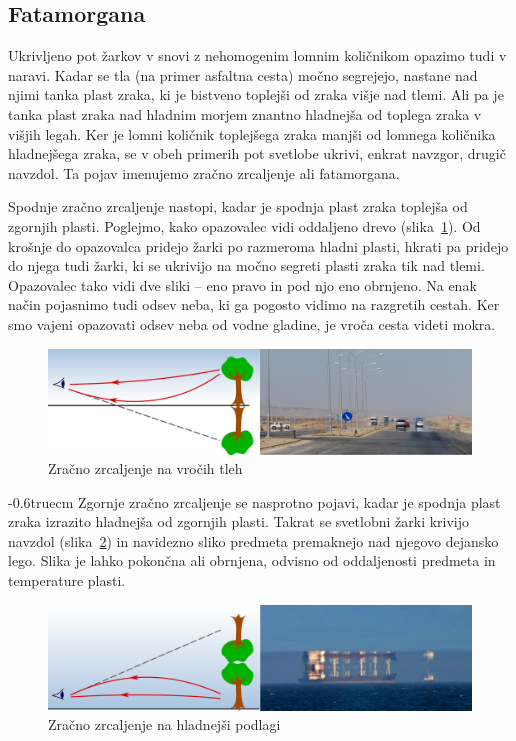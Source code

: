\subsection*{Fatamorgana}
Ukrivljeno pot žarkov v snovi z nehomogenim lomnim količnikom opazimo
tudi v naravi. Kadar se tla (na primer asfaltna cesta) 
močno segrejejo, nastane nad njimi tanka plast zraka, ki je bistveno 
toplejši od zraka višje nad tlemi. Ali pa je tanka plast zraka nad 
hladnim morjem znantno hladnejša od toplega zraka v višjih legah. Ker je 
lomni količnik toplejšega zraka manjši od lomnega količnika hladnejšega zraka, 
se v obeh primerih pot svetlobe ukrivi, enkrat navzgor, drugič navzdol. Ta pojav
imenujemo zračno zrcaljenje ali fatamorgana. 

Spodnje zračno zrcaljenje nastopi, kadar je spodnja plast zraka toplejša 
od zgornjih plasti. Poglejmo, kako opazovalec vidi oddaljeno drevo 
(slika~\ref{fig:02_Fata1}). Od krošnje do opazovalca pridejo žarki
po razmeroma hladni plasti, hkrati pa pridejo do njega tudi žarki, ki 
se ukrivijo na močno segreti plasti zraka tik nad tlemi. Opazovalec
tako vidi dve sliki -- eno pravo in pod njo eno obrnjeno. Na enak način 
pojasnimo tudi odsev neba, ki ga pogosto vidimo na razgretih cestah.
Ker smo vajeni opazovati
odsev neba od vodne gladine, je vroča cesta videti mokra.
\begin{figure}[h!]
\centering
\includegraphics[width=12truecm]{slike/02_Fata1.jpg}
\caption{Zračno zrcaljenje na vročih tleh}
\label{fig:02_Fata1}
\end{figure}
\vglue-0.6truecm
Zgornje zračno zrcaljenje se nasprotno pojavi, 
kadar je spodnja plast zraka izrazito hladnejša od zgornjih plasti. 
Takrat se svetlobni žarki krivijo navzdol (slika~\ref{fig:02_Fata2})
in navidezno sliko predmeta premaknejo nad njegovo dejansko lego. 
Slika je lahko pokončna ali obrnjena, odvisno od oddaljenosti predmeta
in temperature plasti. 
\begin{figure}[h!]
\centering
\includegraphics[width=12truecm]{slike/02_Fata2.jpg}
\caption{Zračno zrcaljenje na hladnejši podlagi}
\label{fig:02_Fata2}
\end{figure}
